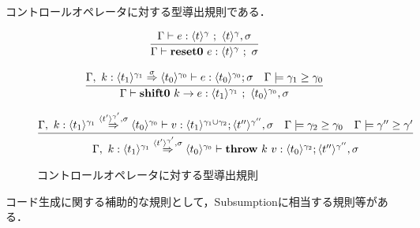 コントロールオペレータに対する型導出規則である．

\begin{figure}[H]
  \centering
  \[
    \infer{\Gamma \vdash \resetz{e} : \codeT{t}{\gamma} ~;~ \sigma}
    {\Gamma \vdash e : \codeT{t}{\gamma} ~;~ \codeT{t}{\gamma}, \sigma}
  \]

  \[
    \infer{\Gamma \vdash \shiftz{k}{e} : \codeT{t_1}{\gamma_1} ~;~ \codeT{t_0}{\gamma_0},\sigma}
    {\Gamma,~k:\contT{\codeT{t_1}{\gamma_1}}{\codeT{t_0}{\gamma_0}}{\sigma}
      \vdash e : \codeT{t_0}{\gamma_0} ; \sigma
      & \Gamma \models \gamma_1 \ord \gamma_0
    }
  \]

  \[
    \infer
    {\Gamma,~ k:\contT{\codeT{t_1}{\gamma_1}}{\codeT{t_0}{\gamma_0}}{\codeT{t'}{\gamma'},\sigma}
      \vdash \throw{k}{v} : \codeT{t_0}{\gamma_2} ; \codeT{t''}{\gamma''},\sigma}
    {\Gamma,~ k:\contT{\codeT{t_1}{\gamma_1}}{\codeT{t_0}{\gamma_0}}{\codeT{t'}{\gamma'},\sigma}
      \vdash v : \codeT{t_1}{\gamma_1 \cup \gamma_2} ; \codeT{t''}{\gamma''},\sigma
      & \Gamma \models \gamma_2 \ord \gamma_0
      & \Gamma \models \gamma'' \ord \gamma'
    }
  \]
  \caption{コントロールオペレータに対する型導出規則}
  \label{fig:controlop_type_rule}
\end{figure}
\hrulefill

コード生成に関する補助的な規則として，Subsumptionに相当する規則等がある．



